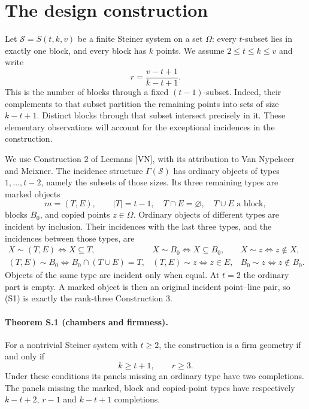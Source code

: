 \section{The design construction}

Let $\mathcal S=S(t,k,v)$ be a finite Steiner system on a set $\Omega$:
every $t$-subset lies in exactly one block, and every block has $k$
points. We assume $2\leq t\leq k\leq v$ and write
\[
 r=\frac{v-t+1}{k-t+1}.
\]
This is the number of blocks through a fixed $(t-1)$-subset. Indeed,
their complements to that subset partition the remaining points into
sets of size $k-t+1$. Distinct blocks through that subset intersect
precisely in it. These elementary observations will account for the
exceptional incidences in the construction.

We use Construction 2 of Leemans [VN], with its attribution to Van
Nypelseer and Meixner. The incidence structure $\Gamma(\mathcal S)$ has
ordinary objects of types $1,\ldots,t-2$, namely the subsets of those
sizes. Its three remaining types are marked objects
\[
 m=(T,E),\qquad |T|=t-1,\quad T\cap E=\varnothing,
 \quad T\cup E\text{ a block},
\]
blocks $B_0$, and copied points $z\in\Omega$. Ordinary objects of
different types are incident by inclusion. Their incidences with the
last three types, and the incidences between those types, are
\[
\begin{array}{lll}
 X\sim(T,E)\iff X\subseteq T,&
 X\sim B_0\iff X\subseteq B_0,&
 X\sim z\iff z\notin X,\\
 (T,E)\sim B_0\iff B_0\cap(T\cup E)=T,&
 (T,E)\sim z\iff z\in E,&
 B_0\sim z\iff z\notin B_0.
\end{array}                                                    \tag{S1}
\]
Objects of the same type are incident only when equal. At $t=2$ the
ordinary part is empty. A marked object is then an original incident
point--line pair, so (S1) is exactly the rank-three Construction 3.

\paragraph{Theorem S.1 (chambers and firmness).}
For a nontrivial Steiner system with $t\geq2$, the construction is a
firm geometry if and only if
\[
 k\geq t+1,\qquad r\geq3.                                    \tag{S2}
\]
Under these conditions its panels missing an ordinary type have two
completions. The panels missing the marked, block and copied-point
types have respectively $k-t+2$, $r-1$ and $k-t+1$ completions.

